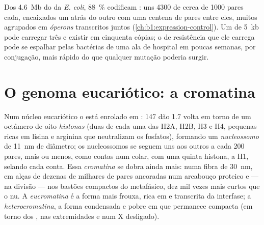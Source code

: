 \begin{example}\label{ex:b1:genomes:dense}
Dos \qty{4.6}{Mb} do  da \emph{E. coli}, \qty{88}{\%}
codificam : uns \num{4300}  de cerca de \num{1000} pares
cada, encaixados um atrás do outro com uma centena de pares entre eles,
muitos agrupados em \emph{óperons} transcritos juntos
(\cref{ch:b1:expression-control}). Um  de \qty{5}{kb} pode
carregar três  e existir em cinquenta cópias; o  de
resistência que ele carrega pode se espalhar pelas bactérias de uma ala
de hospital em poucas semanas, por conjugação, mais rápido do que
qualquer mutação poderia surgir.
\end{example}

\section{O genoma eucariótico: a cromatina}

\begin{definition}\label{def:b1:genomes:nucleosome}
Num núcleo eucariótico o  está enrolado em : \qty{147}{}
 dão 1.7 volta em torno de um octâmero de oito
\emph{histonas} (duas de cada uma das H2A, H2B, H3 e H4, 
pequenas ricas em lisina e arginina que neutralizam os fosfatos),
formando um \emph{nucleossomo} de \qty{11}{nm} de
diâmetro; os nucleossomos se seguem uns aos outros a cada \qty{200}{}
pares, mais ou menos, como contas num colar, com uma quinta histona, a
H1, selando cada conta. Essa \emph{cromatina} se dobra ainda mais: numa
fibra de \qty{30}{nm}, em alças de dezenas de milhares de pares
ancoradas num arcabouço proteico e --- na divisão --- nos bastões
compactos do  metafásico, dez mil vezes mais curtos que o 
nu. A \emph{eucromatina} é a forma mais frouxa, rica em  e
transcrita da interfase; a \emph{heterocromatina}, a forma condensada e
pobre em  que permanece compacta (em torno dos , nas
extremidades e num  X desligado).
\end{definition}

